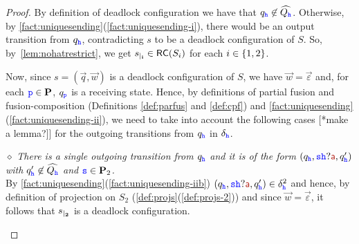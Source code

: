 \begin{proof}
By definition of deadlock configuration we have that
$q_{{\mathtt{\color{blue}{ {h}}}}}\not\in\widehat{Q_{{\mathtt{\color{blue}{ {h}}}}}}$.
Otherwise, by  \cref{fact:uniquesending}(\ref{fact:uniquesending-i}), 
there would be an output transition from $q_{{\mathtt{\color{blue}{ {h}}}}}$, contradicting $s$ to be a deadlock configuration of $S$.
So, by~\cref{lem:nohatrestrict}, we get ${s}_{\mid_{\mathbf{i}}}\in \mathsf{RC}(S_i)$ for each $i\in \{1,2\}$.

Now, since $s= (\vec{q},\vec{w})$ is a deadlock configuration of $S$, we have $\vec{w}=\vec{\varepsilon}$ and, for each ${\mathtt{\color{blue}{ {p}}}}\in\mathbf{P}$, $q_{\mathtt{\color{blue}{ {p}}}}$  is a receiving state.
Hence, by definitions of  partial fusion and fusion-composition 
(Definitions \ref{def:parfus} and \ref{def:cpf}) and \cref{fact:uniquesending}(\ref{fact:uniquesending-ii}),
we need  to 
take into account the following cases [*make a lemma?]] for the outgoing transitions from $q_{{\mathtt{\color{blue}{ {h}}}}}$  in 
$\delta_{{\mathtt{\color{blue}{ {h}}}}}$.

\begin{description}  
  \item
\underline{$\diamond$} 
{\em  There is a single outgoing transition from $q_{\mathtt{\color{blue}{ {h}}}}$ and it is of the form
$(q_{\HH},\tts{\HH}?\msg[a],q'_\hh)$ with $q'_{\mathtt{\color{blue}{ {h}}}}\not\in\widehat{Q_{\mathtt{\color{blue}{ {h}}}}}$ and ${\mathtt{\color{blue}{ {s}}}}\in\mathbf{P}_2$.}\\
 By \cref{fact:uniquesending}(\ref{fact:uniquesending-iib})
 $(q_{\HH},\tts{\HH}?\msg[a],q'_\hh)\in\delta^2_\hh$ and hence, by definition of projection
 on $S_2$ (\cref{def:projs}(\ref{def:projs-2})) and since $\vec{w}=\vec{\varepsilon}$,
 it follows that ${s}_{\mid_{\mathbf{2}}}$ is a deadlock configuration.
  


\end{description}
\end{proof}
